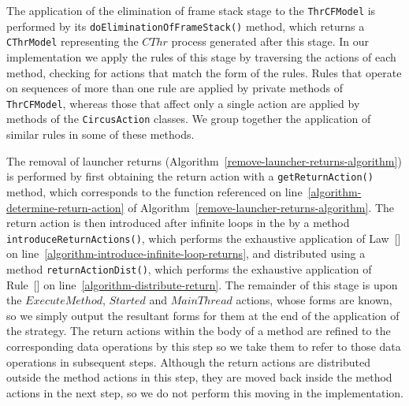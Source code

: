 The application of the elimination of frame stack stage to the
\texttt{ThrCFModel} is performed by its
\texttt{doEliminationOfFrameStack()} method, which returns a
\texttt{CThrModel} representing the $CThr$ process generated after
this stage.
In our implementation we apply the rules of this stage by traversing
the actions of each method, checking for actions that match the form
of the rules.
Rules that operate on sequences of more than one rule are applied by
private methods of \texttt{ThrCFModel}, whereas those that affect only
a single action are applied by methods of the \texttt{CircusAction}
classes.
We group together the application of similar rules in some of these
methods.

The removal of launcher returns
(Algorithm~\ref{remove-launcher-returns-algorithm}) is performed by
first obtaining the return action with a \texttt{getReturnAction()}
method, which corresponds to the  function
referenced on line~\ref{algorithm-determine-return-action} of
Algorithm~\ref{remove-launcher-returns-algorithm}.
The return action is then introduced after infinite loops in the by a
method \texttt{introduceReturnActions()}, which performs the
exhaustive application of Law~[] on
line~\ref{algorithm-introduce-infinite-loop-returns}, and distributed
using a method \texttt{returnActionDist()}, which performs the
exhaustive application of Rule~[] on
line~\ref{algorithm-distribute-return}.
The remainder of this stage is upon the $ExecuteMethod$, $Started$ and
$MainThread$ actions, whose forms are known, so we simply output the
resultant forms for them at the end of the application of the
strategy.
The return actions within the body of a method are refined to the
corresponding data operations by this step so we take them to refer to
those data operations in subsequent steps.
Although the return actions are distributed outside the method actions
in this step, they are moved back inside the method actions in the
next step, so we do not perform this moving in the implementation.

